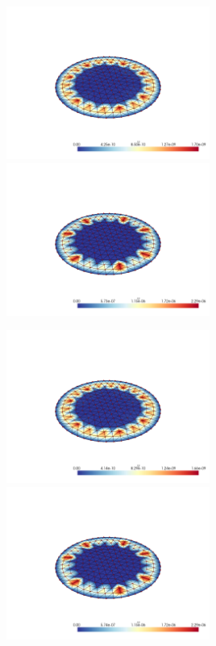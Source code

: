 \documentclass[
  11pt,
]{article}
\let\origfigure\figure
\let\endorigfigure\endfigure
\renewenvironment{figure}[1][2] {
    \expandafter\origfigure\expandafter[H]
} {
    \endorigfigure
}
\begin{document}
\begin{figure}
\caption{Finite element error in the L2 and H1 norms/seminorms, respectively for problem 1 over mesh number 2 using order 2 quadrature.}
\end{figure}

\includegraphics[width=0.5\textwidth,height=\textheight]{../img/mesh2-gauss05-L2.png}
\includegraphics[width=0.5\textwidth,height=\textheight]{../img/mesh2-gauss05-H1.png}

\begin{figure}
\caption{Finite element error in the L2 and H1 norms/seminorms, respectively for problem 1 over mesh number 2 using order 5 quadrature.}
\end{figure}

\includegraphics[width=0.5\textwidth,height=\textheight]{../img/mesh2-gauss08-L2.png}
\includegraphics[width=0.5\textwidth,height=\textheight]{../img/mesh2-gauss08-H1.png}
\end{document}
